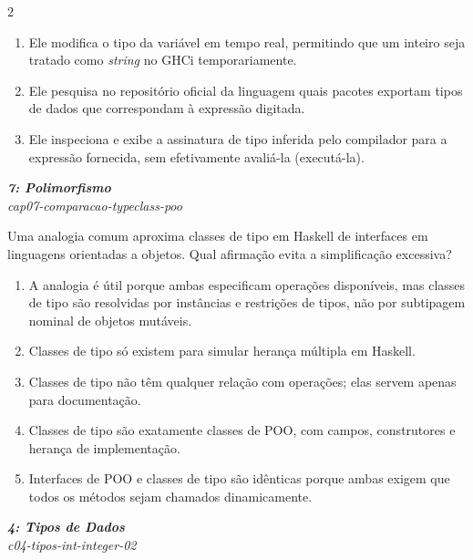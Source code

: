 \documentclass[a4paper,10pt,brazil]{article}
\begin{document}
\begin{multicols}{2}
\begin{enumerate}
  \item Ele modifica o tipo da variável em tempo real, permitindo que um inteiro seja tratado como \emph{string} no GHCi temporariamente.

  \item Ele pesquisa no repositório oficial da linguagem quais pacotes exportam tipos de dados que correspondam à expressão digitada.

  \item Ele inspeciona e exibe a assinatura de tipo inferida pelo compilador para a expressão fornecida, sem efetivamente avaliá-la (executá-la).


\end{enumerate}

\begin{flushright}
  \footnotesize
  \textit{\textbf{7: Polimorfismo}}\\
  \textit{cap07-comparacao-typeclass-poo}\\

\end{flushright}
Uma analogia comum aproxima classes de tipo em Haskell de interfaces em linguagens orientadas a objetos. Qual afirmação evita a simplificação excessiva?
\begin{enumerate}
  \item A analogia é útil porque ambas especificam operações disponíveis, mas classes de tipo são resolvidas por instâncias e restrições de tipos, não por subtipagem nominal de objetos mutáveis.
  \item Classes de tipo só existem para simular herança múltipla em Haskell.
  \item Classes de tipo não têm qualquer relação com operações; elas servem apenas para documentação.
  \item Classes de tipo são exatamente classes de POO, com campos, construtores e herança de implementação.
  \item Interfaces de POO e classes de tipo são idênticas porque ambas exigem que todos os métodos sejam chamados dinamicamente.

\end{enumerate}

\begin{flushright}
  \footnotesize
  \textit{\textbf{4: Tipos de Dados}}\\
  \textit{c04-tipos-int-integer-02}\\


\end{flushright}
\end{multicols}
\end{document}
